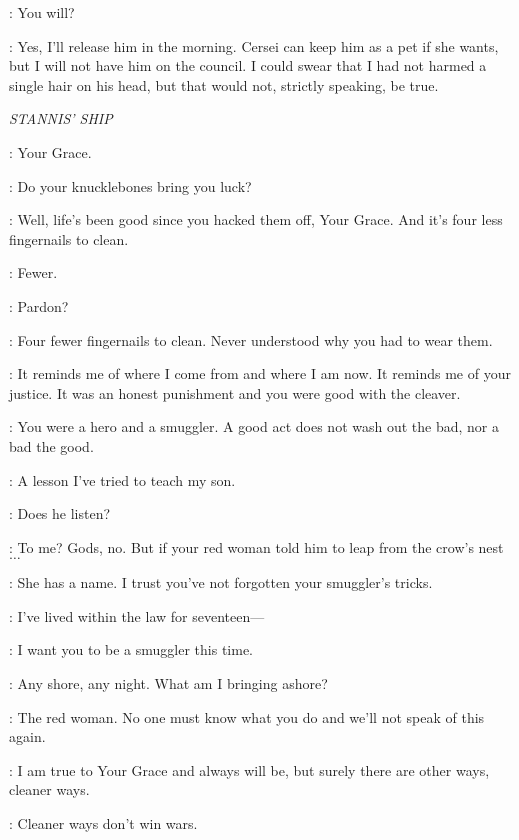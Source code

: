 \LANCEL: You will? 

\TYRION: Yes, I'll release him in the morning. Cersei can keep him as a pet if she wants, but I will not have him on the council. I could swear that I had not harmed a single hair on his head, but that would not, strictly speaking, be true. 



\scene

\textit{STANNIS' SHIP} 


\DAVOS: Your Grace. 

\STANNIS: Do your knucklebones bring you luck? 

\DAVOS: Well, life's been good since you hacked them off, Your Grace. And it's four less fingernails to clean. 

\STANNIS: Fewer. 

\DAVOS: Pardon? 

\STANNIS: Four fewer fingernails to clean. Never understood why you had to wear them. 

\DAVOS: It reminds me of where I come from and where I am now. It reminds me of your justice. It was an honest punishment and you were good with the cleaver. 

\STANNIS: You were a hero and a smuggler. A good act does not wash out the bad, nor a bad the good. 

\DAVOS: A lesson I've tried to teach my son. 

\STANNIS: Does he listen? 

\DAVOS: To me? Gods, no. But if your red woman told him to leap from the crow's nest$\ldots$  

\STANNIS: She has a name. I trust you've not forgotten your smuggler's tricks. 

\DAVOS: I've lived within the law for seventeen--- 

\STANNIS:   I want you to be a smuggler this time. 

\DAVOS: Any shore, any night. What am I bringing ashore? 

\STANNIS: The red woman. No one must know what you do and we'll not speak of this again. 

\DAVOS: I am true to Your Grace and always will be, but surely there are other ways, cleaner ways. 

\STANNIS: Cleaner ways don't win wars. 


